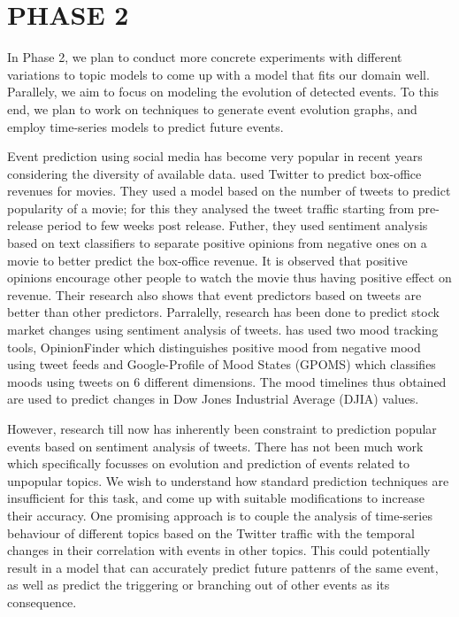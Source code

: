 \section{\uppercase{Phase 2}}
In Phase 2, we plan to conduct more concrete experiments with different variations to topic models to come up with a model that fits our domain well. Parallely, we aim to focus on modeling the evolution of detected events. To this end, we plan to work on techniques to generate event evolution graphs, and employ time-series models to predict future events. 

Event prediction using social media has become very popular in recent years considering the diversity of available data. \cite{asur2010predicting} used Twitter to predict box-office revenues for movies. They used a model based on the number of tweets to predict popularity of a movie; for this they analysed the tweet traffic starting from pre-release period to few weeks post release. Futher, they used sentiment analysis based on text classifiers to separate positive opinions from negative ones on a movie to better predict the box-office revenue. It is observed that positive opinions encourage other people to watch the movie thus having positive effect on revenue. Their research also shows that event predictors based on tweets are better than other predictors. Parralelly, research has been done to predict stock market changes using sentiment analysis of tweets. \cite{bollen2011twitter} has used two mood tracking tools, OpinionFinder which distinguishes positive mood from negative mood using tweet feeds and Google-Profile of Mood States (GPOMS) which classifies moods using tweets on 6 different dimensions. The mood timelines thus obtained are used to predict changes in Dow Jones Industrial Average (DJIA) values.

However, research till now has inherently been constraint to prediction popular events based on sentiment analysis of tweets. There has not been much work which specifically focusses on evolution and prediction of events related to unpopular topics. We wish to understand how standard prediction techniques are insufficient for this task, and come up with suitable modifications to increase their accuracy. One promising approach is to couple the analysis of time-series behaviour of different topics based on the Twitter traffic with the temporal changes in their correlation with events in other topics. This could potentially result in a model that can accurately predict future pattenrs of the same event, as well as predict the triggering or branching out of other events as its consequence.